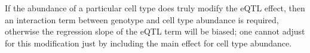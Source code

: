 

If the abundance of a particular cell type does truly modify the \gls{eQTL} effect, 
then an interaction term between genotype and cell type abundance is required,
otherwise the regression slope of the \gls{eQTL} term will be biased;
one cannot adjust for this modification just by including the main effect for cell type abundance.
%

